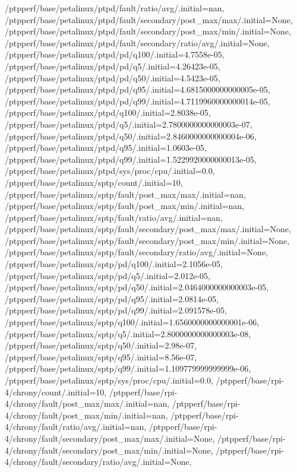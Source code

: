 {    /ptpperf/base/petalinux/ptpd/fault/ratio/avg/.initial=nan,
    /ptpperf/base/petalinux/ptpd/fault/secondary/post_max/max/.initial=None,
    /ptpperf/base/petalinux/ptpd/fault/secondary/post_max/min/.initial=None,
    /ptpperf/base/petalinux/ptpd/fault/secondary/ratio/avg/.initial=None,
    /ptpperf/base/petalinux/ptpd/pd/q100/.initial=4.7558e-05,
    /ptpperf/base/petalinux/ptpd/pd/q5/.initial=4.26423e-05,
    /ptpperf/base/petalinux/ptpd/pd/q50/.initial=4.5423e-05,
    /ptpperf/base/petalinux/ptpd/pd/q95/.initial=4.6815000000000005e-05,
    /ptpperf/base/petalinux/ptpd/pd/q99/.initial=4.7119960000000014e-05,
    /ptpperf/base/petalinux/ptpd/q100/.initial=2.8038e-05,
    /ptpperf/base/petalinux/ptpd/q5/.initial=2.7800000000000003e-07,
    /ptpperf/base/petalinux/ptpd/q50/.initial=2.8460000000000004e-06,
    /ptpperf/base/petalinux/ptpd/q95/.initial=1.0603e-05,
    /ptpperf/base/petalinux/ptpd/q99/.initial=1.5229920000000013e-05,
    /ptpperf/base/petalinux/ptpd/sys/proc/cpu/.initial=0.0,
    /ptpperf/base/petalinux/sptp/count/.initial=10,
    /ptpperf/base/petalinux/sptp/fault/post_max/max/.initial=nan,
    /ptpperf/base/petalinux/sptp/fault/post_max/min/.initial=nan,
    /ptpperf/base/petalinux/sptp/fault/ratio/avg/.initial=nan,
    /ptpperf/base/petalinux/sptp/fault/secondary/post_max/max/.initial=None,
    /ptpperf/base/petalinux/sptp/fault/secondary/post_max/min/.initial=None,
    /ptpperf/base/petalinux/sptp/fault/secondary/ratio/avg/.initial=None,
    /ptpperf/base/petalinux/sptp/pd/q100/.initial=2.1056e-05,
    /ptpperf/base/petalinux/sptp/pd/q5/.initial=2.012e-05,
    /ptpperf/base/petalinux/sptp/pd/q50/.initial=2.0464000000000003e-05,
    /ptpperf/base/petalinux/sptp/pd/q95/.initial=2.0814e-05,
    /ptpperf/base/petalinux/sptp/pd/q99/.initial=2.091578e-05,
    /ptpperf/base/petalinux/sptp/q100/.initial=1.6560000000000001e-06,
    /ptpperf/base/petalinux/sptp/q5/.initial=2.8000000000000003e-08,
    /ptpperf/base/petalinux/sptp/q50/.initial=2.98e-07,
    /ptpperf/base/petalinux/sptp/q95/.initial=8.56e-07,
    /ptpperf/base/petalinux/sptp/q99/.initial=1.109779999999999e-06,
    /ptpperf/base/petalinux/sptp/sys/proc/cpu/.initial=0.0,
    /ptpperf/base/rpi-4/chrony/count/.initial=10,
    /ptpperf/base/rpi-4/chrony/fault/post_max/max/.initial=nan,
    /ptpperf/base/rpi-4/chrony/fault/post_max/min/.initial=nan,
    /ptpperf/base/rpi-4/chrony/fault/ratio/avg/.initial=nan,
    /ptpperf/base/rpi-4/chrony/fault/secondary/post_max/max/.initial=None,
    /ptpperf/base/rpi-4/chrony/fault/secondary/post_max/min/.initial=None,
    /ptpperf/base/rpi-4/chrony/fault/secondary/ratio/avg/.initial=None,
}
